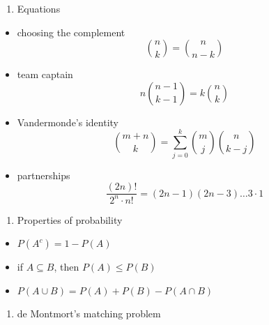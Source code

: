 \documentclass[
]{article}
\providecommand{\tightlist}{%
  \setlength{\itemsep}{0pt}\setlength{\parskip}{0pt}}
\begin{document}
\begin{enumerate}
\def\labelenumi{\arabic{enumi}.}
\setcounter{enumi}{3}
\tightlist
\item
  Equations
\end{enumerate}

\begin{itemize}
\item
  choosing the complement \[ {n \choose k} = {n \choose n-k} \]
\item
  team captain \[ n{n-1 \choose k-1} = k{n \choose k} \]
\item
  Vandermonde's identity
  \[ {m+n \choose k} = \sum_{j=0}^{k}{m \choose j}{n \choose k-j} \]
\item
  partnerships
  \[ \frac{(2n)!}{2^n \cdot n!} = (2n-1)(2n-3) \ldots 3 \cdot 1 \]
\end{itemize}

\begin{enumerate}
\def\labelenumi{\arabic{enumi}.}
\setcounter{enumi}{4}
\tightlist
\item
  Properties of probability
\end{enumerate}

\begin{itemize}
\tightlist
\item
  \(P(A^c) = 1 - P(A)\)
\item
  if \(A \subseteq B\), then \(P(A) \leq P(B)\)
\item
  \(P(A \cup B) = P(A) + P(B) - P(A \cap B)\)
\end{itemize}

\begin{enumerate}
\def\labelenumi{\arabic{enumi}.}
\setcounter{enumi}{5}
\tightlist
\item
  de Montmort's matching problem
\end{enumerate}
\end{document}
